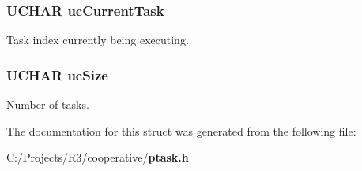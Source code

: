 \subsubsection[{ucCurrentTask}]{\setlength{\rightskip}{0pt plus 5cm}UCHAR {\bf ucCurrentTask}}\label{struct_p_t_a_s_k___l_i_s_t___s_t_r_u_c_t_ae501180ced1e06feea4d89634ee15f9f}


Task index currently being executing. 
\subsubsection[{ucSize}]{\setlength{\rightskip}{0pt plus 5cm}UCHAR {\bf ucSize}}\label{struct_p_t_a_s_k___l_i_s_t___s_t_r_u_c_t_a337c0e603ae3d59d95c77626cabab943}


Number of tasks. 

The documentation for this struct was generated from the following file:\begin{DoxyCompactItemize}
\item 
C:/Projects/R3/cooperative/{\bf ptask.h}\end{DoxyCompactItemize}
